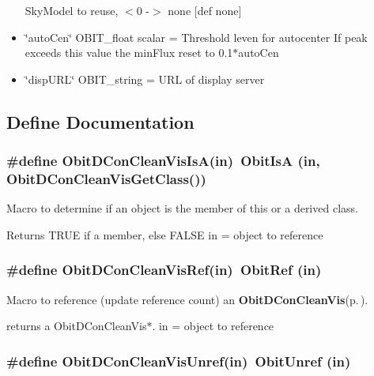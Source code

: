\begin{itemize}
Sky\-Model to reuse, $<$0 -$>$ none [def none] \item \char`\"{}auto\-Cen\char`\"{} OBIT\_\-float scalar = Threshold leven for autocenter If peak exceeds this value the min\-Flux reset to 0.1$\ast$auto\-Cen \item \char`\"{}disp\-URL\char`\"{} OBIT\_\-string = URL of display server\end{itemize}


\subsection{Define Documentation}
\subsubsection{\setlength{\rightskip}{0pt plus 5cm}\#define Obit\-DCon\-Clean\-Vis\-Is\-A(in)\ Obit\-Is\-A (in, Obit\-DCon\-Clean\-Vis\-Get\-Class())}\label{ObitDConCleanVis_8h_a2}


Macro to determine if an object is the member of this or a derived class. 

Returns TRUE if a member, else FALSE in = object to reference 
\subsubsection{\setlength{\rightskip}{0pt plus 5cm}\#define Obit\-DCon\-Clean\-Vis\-Ref(in)\ Obit\-Ref (in)}\label{ObitDConCleanVis_8h_a1}


Macro to reference (update reference count) an {\bf Obit\-DCon\-Clean\-Vis}{\rm (p.\,\pageref{structObitDConCleanVis})}. 

returns a Obit\-DCon\-Clean\-Vis$\ast$. in = object to reference 
\subsubsection{\setlength{\rightskip}{0pt plus 5cm}\#define Obit\-DCon\-Clean\-Vis\-Unref(in)\ Obit\-Unref (in)}\label{ObitDConCleanVis_8h_a0}


